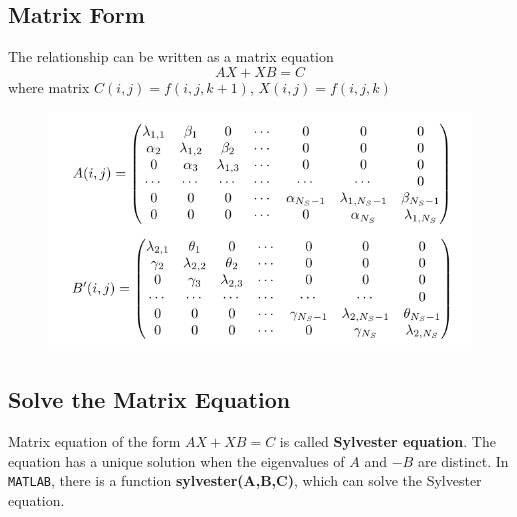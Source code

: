 \subsection{Matrix Form}
The relationship can be written as a matrix equation
\[
    AX + XB = C
\]
where matrix $C(i, j) = f(i, j, k+1)$, $X(i, j) = f(i, j, k)$

\begin{figure}[H]
    \centering
    \includegraphics[width=.7\textwidth]{figures/2019-12-25-matrix-form.png}
\end{figure}


\subsection{Solve the Matrix Equation}
Matrix equation of the form $AX + XB = C$ is called \textbf{Sylvester equation}. The equation has a unique solution when the eigenvalues of $A$ and $−B$ are distinct. In \texttt{MATLAB}, there is a function \textbf{sylvester(A,B,C)}, which can solve the Sylvester equation.
